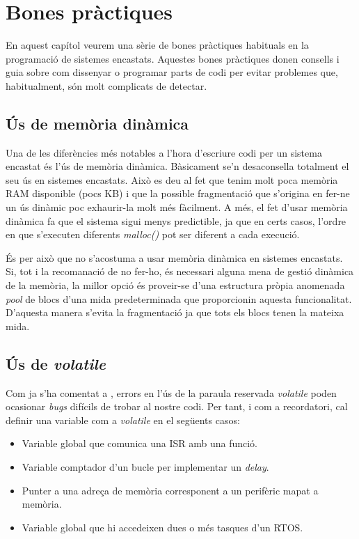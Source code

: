 \chapter{Bones pràctiques}

En aquest capítol veurem una sèrie de bones pràctiques habituals en la programació de sistemes encastats. Aquestes bones pràctiques donen consells i guia sobre com dissenyar o programar parts de codi per evitar problemes que, habitualment, són molt complicats de detectar.

\section{Ús de memòria dinàmica}
Una de les diferències més notables a l'hora d'escriure codi per un sistema encastat és l'ús de memòria dinàmica. Bàsicament se'n desaconsella totalment el seu ús en sistemes encastats. Això es deu al fet que tenim molt poca memòria RAM disponible (pocs KB) i que la possible fragmentació que s'origina en fer-ne un ús dinàmic poc exhaurir-la molt més fàcilment. A més, el fet d'usar memòria dinàmica fa que el sistema sigui menys predictible, ja que en certs casos, l'ordre en que s'executen diferents {\em malloc()} pot ser diferent a cada execució.

És per això que no s'acostuma a usar memòria dinàmica en sistemes encastats. Si, tot i la recomanació de no fer-ho, és necessari alguna mena de gestió dinàmica de la memòria, la millor opció és proveir-se d'una estructura pròpia {anomenada \em pool} de blocs d'una mida predeterminada que proporcionin aquesta funcionalitat. D'aquesta manera s'evita la fragmentació ja que tots els blocs tenen la mateixa mida.

\section{Ús de {\em volatile}}
Com ja s'ha comentat a , errors en l'ús de la paraula reservada {\em volatile} poden ocasionar {\em bugs} difícils de trobar al nostre codi. Per tant, i com a recordatori, cal definir una variable com a {\em volatile} en el següents casos:
\begin{itemize}
 \item Variable global que comunica una ISR amb una funció.
 \item Variable comptador d'un bucle per implementar un {\em delay}.
 \item Punter a una adreça de memòria corresponent a un perifèric mapat a memòria.
 \item Variable global que hi accedeixen dues o més tasques d'un RTOS.
\end{itemize}

